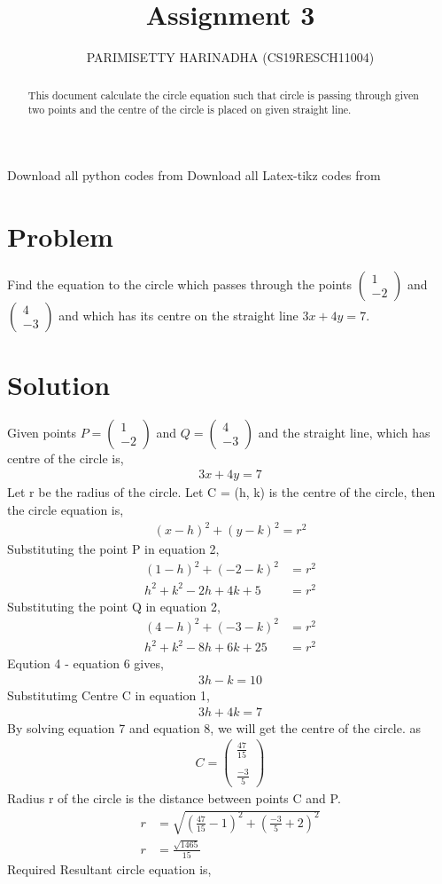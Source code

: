 \documentclass[journal,12pt,twocolumn]{IEEEtran}
\title{Assignment 3}
\author{PARIMISETTY HARINADHA (CS19RESCH11004)}
\newcommand{\myvec}[1]{\ensuremath{\begin{pmatrix}#1\end{pmatrix}}}
\begin{document}
\maketitle
\newpage
\begin{abstract}
This document calculate the circle equation such that circle is passing through given two points and the centre of the circle is placed on given straight line.
\end{abstract}
Download all python codes from 
Download all Latex-tikz codes from 
\section{Problem}
Find the equation to the circle which passes through the points $\myvec{ 1 \\ -2 }$ and $\myvec{ 4 \\ -3 }$ and which has its centre on the straight line $3x + 4y = 7$.

\section{Solution}
Given points $P = \myvec{ 1 \\ -2 }$ and $Q = \myvec{ 4 \\ -3 }$ and the straight line, which has centre of the circle is,
\begin{align} 
3x + 4y = 7
\end {align}
Let r be the radius of the circle.
Let C = (h, k) is the centre of the circle, then the circle equation is,
\begin{align} 
(x-h)^2 + (y-k)^2 = r^2
\end {align}
Substituting the point P in equation 2,
\begin{align} 
(1-h)^2 + (-2-k)^2 &= r^2 \\
h^2 + k^2 -2h + 4k +5 &= r^2
\end {align}
Substituting the point Q in equation 2,
\begin{align} 
(4-h)^2 + (-3-k)^2 &= r^2 \\
h^2 + k^2 -8h + 6k + 25 &= r^2
\end {align}
Eqution 4 - equation 6 gives,
\begin{align} 
3h - k = 10
\end {align}
Substitutimg Centre C in equation 1,
\begin{align} 
3h + 4k = 7
\end {align}
By solving equation 7 and equation 8, we will get the centre of the circle.
 as 
\begin{align} 
C = \myvec{ \frac{47}{15}\\ \\ \frac{-3}{5} }
\end {align}
Radius r of the circle is the distance between points C and P.
\begin{align} 
r &= \sqrt{(\frac{47}{15} - 1)^2 + (\frac{-3}{5} + 2)^2} \\
r &= \frac{\sqrt{1465}}{15}
\end {align}
Required Resultant circle equation is,
\end{document}
